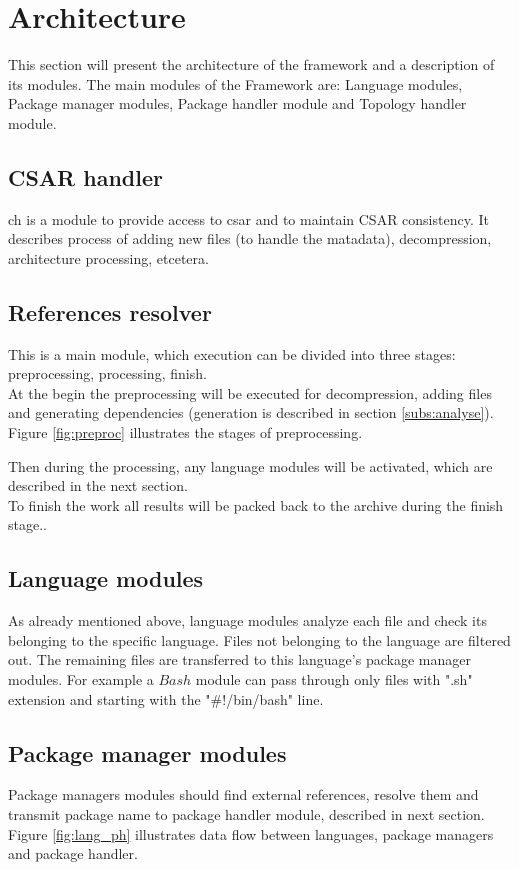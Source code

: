 \section{Architecture}\label{sec:arch}
This section will present the architecture of the framework and a description of its modules.
The main modules of the Framework are: Language modules, Package manager modules, Package handler module and Topology handler module.

\subsection{CSAR handler} \label{subs:casr_h}
\gls{ch} is a module to provide access to \gls{csar} and to maintain CSAR consistency. 
It describes process of adding new files (to handle the matadata), decompression, architecture processing, etcetera.

\subsection{References resolver} \label{subs:RR}
This is a main module, which execution can be divided into three stages: preprocessing, processing, finish. \\
At the begin the preprocessing will be executed for decompression, adding files and generating dependencies (generation is described in section \ref{subs:analyse}).
Figure \ref{fig:preproc} illustrates the stages of preprocessing.

Then during the processing, any language modules will be activated, which are described in the next section. \\
To finish the work  all results will be packed back to the archive during the finish stage..
\subsection{Language modules} \label{subs:archlm}
As already mentioned above, language modules analyze each file and check its belonging to the specific language. 
Files not belonging to the language are filtered out.
The remaining files are transferred to this language's package manager modules.
For example a $Bash$ module can pass through only files with ".sh" extension and starting with the "\#!/bin/bash" line.
\subsection{Package manager modules} \label{subs:archpmm}
Package managers modules should find external references, resolve them and transmit package name to package handler module, described in next section.
Figure \ref{fig:lang_ph} illustrates data flow between languages, package managers and package handler.


